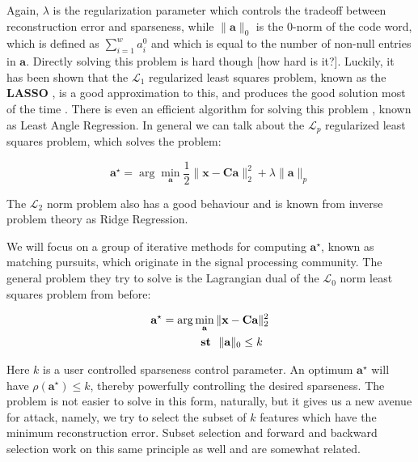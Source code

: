 \documentclass[12pt,a4paper,oneside,english]{UPBThesis}
\begin{document}
Again, $\lambda$ is the regularization parameter which controls the tradeoff between reconstruction error and sparseness, while $\|\textbf{a}\|_0$ is the $0$-norm of the code word, which is defined as $\sum_{i=1}^{w}a_i^0$ and which is equal to the number of non-null entries in $\textbf{a}$. Directly solving this problem is hard though [how hard is it?]. Luckily, it has been shown that the $\mathcal{L}_1$ regularized least squares problem, known as the \textbf{LASSO} \cite{lasso}, is a good approximation to this, and produces the good solution most of the time \cite{undetermined-minimal-L1}. There is even an efficient algorithm for solving this problem \cite{least-angle-regression}, known as Least Angle Regression. In general we can talk about the $\mathcal{L}_p$ regularized least squares problem, which solves the problem:

\begin{equation*}
\textbf{a}^{\star} = \arg\min_{\textbf{a}} \frac{1}{2} \| \textbf{x} - \textbf{C}\textbf{a} \|_2^2 + \lambda \| \textbf{a} \|_p
\end{equation*}

The $\mathcal{L}_2$ norm problem also has a good behaviour and is known from inverse problem theory as Ridge Regression.

We will focus on a group of iterative methods for computing $\textbf{a}^\star$, known as matching pursuits, which originate in the signal processing community. The general problem they try to solve is the Lagrangian dual of the $\mathcal{L}_0$ norm least squares problem from before:

\begin{align*}
\textbf{a}^\star = \arg & \min_\textbf{a} \|\textbf{x} - \textbf{C}\textbf{a}\|_2^2 \\
& \text{~~\textbf{st}~~} \|\textbf{a}\|_0 \leq k
\end{align*}

Here $k$ is a user controlled sparseness control parameter. An optimum $\textbf{a}^\star$ will have $\rho(\textbf{a}^\star) \leq k$, thereby powerfully controlling the desired sparseness. The problem is not easier to solve in this form, naturally, but it gives us a new avenue for attack, namely, we try to select the subset of $k$ features which have the minimum reconstruction error. Subset selection and forward and backward selection work on this same principle as well and are somewhat related.
\end{document}

